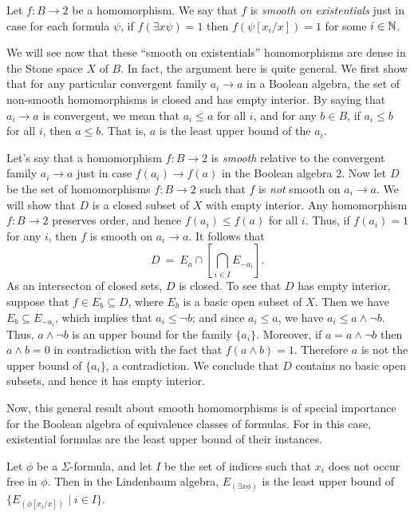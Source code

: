 \begin{defn} Let $f:B\to 2$ be a homomorphism.  We say that $f$ is
  \emph{smooth on existentials} just in case for each formula $\psi$,
  if $f(\exists x \psi )=1$ then $f(\psi [x_i/x])=1$ for some
  $i\in \mathbb N$. \end{defn}

We will see now that these ``smooth on existentials'' homomorphisms
are dense in the Stone space $X$ of $B$.  In fact, the argument here
is quite general.  We first show that for any particular convergent
family $a_i\to a$ in a Boolean algebra, the set of non-smooth
homomorphisms is closed and has empty interior.  By saying that
$a_i\to a$ is convergent, we mean that $a_i\leq a$ for all $i$, and
for any $b\in B$, if $a_i\leq b$ for all $i$, then $a\leq b$.  That
is, $a$ is the least upper bound of the $a_i$.

Let's say that a homomorphism $f:B\to 2$ is \emph{smooth} relative to
the convergent family $a_i\to a$ just in case $f(a_i)\to f(a)$ in the
Boolean algebra $2$.  Now let $D$ be the set of homomorphisms
$f:B\to 2$ such that $f$ is \textit{not} smooth on $a_i\to a$.  We
will show that $D$ is a closed subset of $X$ with empty interior.  Any
homomorphism $f:B\to 2$ preserves order, and hence $f(a_i)\leq f(a)$
for all $i$.  Thus, if $f(a_i)=1$ for any $i$, then $f$ is smooth on
$a_i\to a$.  It follows that
\[ D \: = \: E_a \cap \left[ \bigcap _{i\in I}E_{-a_i} \right] .\] As
an intersecton of closed sets, $D$ is closed.  To see that $D$ has
empty interior, suppose that $f\in E_b\subseteq D$, where $E_b$ is a
basic open subset of $X$.  Then we have $E_b\subseteq E_{-a_i}$, which
implies that $a_i\leq \neg b$; and since $a_i\leq a$, we have
$a_i\leq a\wedge \neg b$.  Thus, $a\wedge \neg b$ is an upper bound
for the family $\{ a_i\}$.  Moreover, if $a=a\wedge \neg b$ then
$a\wedge b=0$ in contradiction with the fact that $f(a\wedge b)=1$.
Therefore $a$ is not the upper bound of $\{ a_i\}$, a contradiction.
We conclude that $D$ contains no basic open subsets, and hence it has
empty interior.

Now, this general result about smooth homomorphisms is of special
importance for the Boolean algebra of equivalence classes of formulas.
For in this case, existential formulas are the least upper bound of
their instances.

\begin{lemma} Let $\phi$ be a $\Sigma$-formula, and let $I$ be the set
  of indices such that $x_i$ does not occur free in $\phi$.  Then in
  the Lindenbaum algebra, $E_{(\exists x\phi )}$ is the least upper
  bound of $\{ E_{(\phi [x_i/x])} \mid i\in I \}$. \end{lemma}

